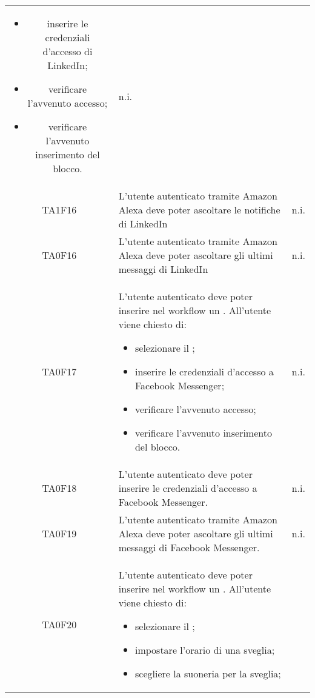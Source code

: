 \begin{center}
\begin{longtable}{ c m{12cm} c }
\begin{itemize}
		\item inserire le credenziali d'accesso di LinkedIn;										
		\item verificare l'avvenuto accesso;										
		\item verificare l'avvenuto inserimento del blocco.										
	\end{itemize} 																													    										& n.i. \\										
	TA1F16   & L'utente autenticato tramite Amazon Alexa deve poter ascoltare le notifiche di LinkedIn                                         										& n.i. \\
	TA0F16   & L'utente autenticato tramite Amazon Alexa deve poter ascoltare gli ultimi messaggi di LinkedIn                                  											& n.i. \\
	TA0F17   & L'utente autenticato deve poter inserire nel workflow un \BMessenger. All'utente viene chiesto di: 
	\begin{itemize}										
		\item selezionare il \BMessenger;										
		\item inserire le credenziali d'accesso a Facebook Messenger;										
		\item verificare l'avvenuto accesso;										
		\item verificare l'avvenuto inserimento del blocco.										
	\end{itemize} 																	                                                    										& n.i. \\
	TA0F18   & L'utente autenticato deve poter inserire le credenziali d'accesso a Facebook Messenger.                          										& n.i. \\
	TA0F19   & L'utente autenticato tramite Amazon Alexa deve poter ascoltare gli ultimi messaggi di Facebook Messenger.                    										& n.i. \\
	TA0F20   & L'utente autenticato deve poter inserire nel workflow un \BSveglia. All'utente viene chiesto di: \begin{itemize}										
		\item selezionare il \BSveglia;										
		\item impostare l'orario di una sveglia;										
		\item scegliere la suoneria per la sveglia;										

\end{itemize}
\end{longtable}
\end{center}
